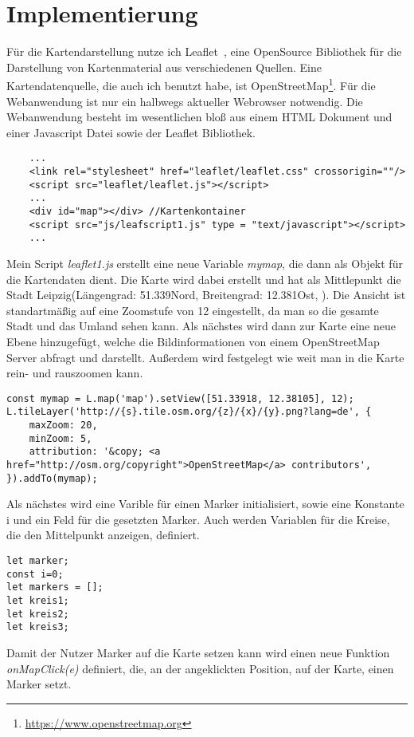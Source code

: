 \documentclass[a4paper, twoside, 12pt]{scrreprt}
\begin{document}
\chapter{Implementierung}
Für die Kartendarstellung nutze ich Leaflet~\citep{crickard2014leaflet}, eine OpenSource Bibliothek für die Darstellung von Kartenmaterial aus verschiedenen Quellen. Eine Kartendatenquelle, die auch ich benutzt habe, ist OpenStreetMap\footnote{\url{https://www.openstreetmap.org}}.
Für die Webanwendung ist nur ein halbwegs aktueller Webrowser notwendig.
Die Webanwendung besteht im wesentlichen bloß aus einem HTML Dokument und einer Javascript Datei sowie der Leaflet Bibliothek.
\begin{lstlisting}
	...
	<link rel="stylesheet" href="leaflet/leaflet.css" crossorigin=""/>
	<script src="leaflet/leaflet.js"></script>
	...
	<div id="map"></div> //Kartenkontainer
	<script src="js/leafscript1.js" type = "text/javascript"></script>
	...
\end{lstlisting}
Mein Script \textit{leaflet1.js} erstellt eine neue Variable \textit{mymap}, die dann als Objekt für die Kartendaten dient.
Die Karte wird dabei erstellt und hat als Mittlepunkt die Stadt Leipzig(Längengrad: 51.339\textdegree Nord, Breitengrad: 12.381\textdegree Ost, ). Die Ansicht ist standartmäßig auf eine Zoomstufe von 12 eingestellt, da man so die gesamte Stadt und das Umland sehen kann.
Als nächstes wird dann zur Karte eine neue Ebene hinzugefügt, welche die Bildinformationen von einem OpenStreetMap Server abfragt und darstellt.
Außerdem wird festgelegt wie weit man in die Karte rein- und rauszoomen kann.
\lstset{language=Java}
\begin{lstlisting}
const mymap = L.map('map').setView([51.33918, 12.38105], 12);
L.tileLayer('http://{s}.tile.osm.org/{z}/{x}/{y}.png?lang=de', {
	maxZoom: 20,
	minZoom: 5,
	attribution: '&copy; <a href="http://osm.org/copyright">OpenStreetMap</a> contributors',
}).addTo(mymap);
\end{lstlisting}
Als nächstes wird eine Varible für einen Marker initialisiert, sowie eine Konstante i und ein Feld für die gesetzten Marker. Auch werden Variablen für die Kreise, die den Mittelpunkt anzeigen, definiert.
\begin{lstlisting}
let marker;
const i=0;
let markers = [];
let kreis1;
let kreis2;
let kreis3;
\end{lstlisting}
Damit der Nutzer Marker auf die Karte setzen kann wird einen neue Funktion \textit{onMapClick(e)} definiert, die, an der angeklickten Position, auf der Karte, einen Marker setzt.
\end{document}
